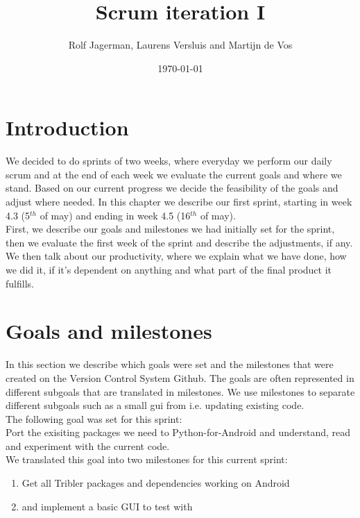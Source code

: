 \documentclass{article}
\title{Scrum iteration I}
\author{Rolf Jagerman, Laurens Versluis and Martijn de Vos}
\date{\today}
\begin{document}
\maketitle

\newpage

\section{Introduction}
	We decided to do sprints of two weeks, where everyday we perform our daily scrum and at the end of each week we evaluate the current goals and where we stand. Based on our current progress we decide the feasibility of the goals and adjust where needed. In this chapter we describe our first sprint, starting in week 4.3 (5$^{th}$ of may) and ending in week 4.5 (16$^{th}$ of may).\\
	First, we describe our goals and milestones we had initially set for the sprint, then we evaluate the first week of the sprint and describe the adjustments, if any. We then talk about our productivity, where we explain what we have done, how we did it, if it's dependent on anything and what part of the final product it fulfills.

\section{Goals and milestones}
	In this section we describe which goals were set and the milestones that were created on the Version Control System Github. The goals are often represented in different subgoals that are translated in milestones. We use milestones to separate different subgoals such as a small gui from i.e. updating existing code.\\
	
	The following goal was set for this sprint:\\
	
	Port the exisiting packages we need to Python-for-Android and understand, read and experiment with the current code.\\
	
	We translated this goal into two milestones for this current sprint:

	\begin{enumerate}
		\item Get all Tribler packages and dependencies working on Android
		\item and implement a basic GUI to test with
	\end{enumerate}
\end{document}
